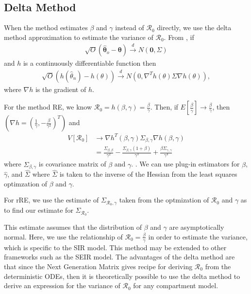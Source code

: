 \documentclass[12pt]{article}
\newcommand{\rr}{\ensuremath{\mathcal{R}_0}}
\begin{document}
\subsection{Delta Method}\label{delta-method}

When the method estimates \(\beta\) and \(\gamma\) instead of \(\rr\) directly, we use the delta method approximation to estimate the
variance of \(\rr\).   From \cite{wasserman2004}, if
\begin{align*}
  \sqrt{O} \left ( \hat{\mathbf{\theta}}_o - \mathbf{\theta} \right ) \overset{d}{\to} N\left ( \mathbf{0}, \Sigma \right  )
\end{align*}
and $h$ is a continuously differentiable function then
\begin{align*}
  \sqrt{O} \left (h(\hat{\theta}_n) - h(\theta) \right ) \overset{d}{\to} N \left (0,  \nabla^T h(\theta)\Sigma \nabla h(\theta)\right ),
\end{align*}
where $\nabla h$ is the gradient of $h$.

For the method RE, we know $\rr = h(\beta, \gamma) = \frac{\beta}{\gamma}$. Then, if $E\left [\frac{\hat{\beta}}{\hat{\gamma}}\right] \to \frac{\beta}{\gamma}$, then  $(\nabla h = (\frac{1}{\gamma},  -\frac{\beta}{\gamma^2})^T)$ and
\begin{align*}
  V[\rr] &\to \nabla h^T(\beta, \gamma) \Sigma_{\beta, \gamma} \nabla h(\beta, \gamma) \\
  &= \frac{\Sigma_{\beta, \beta}}{\gamma^2} - \frac{\Sigma_{\beta, \gamma}(1 + \beta)}{\gamma^3} + \frac{\beta \Sigma_{\gamma, \gamma}}{\gamma^4}
\end{align*}
where $\Sigma_{\beta, \gamma}$ is covariance matrix of \(\beta\) and \(\gamma\). .  We can use plug-in estimators for $\hat{\beta}$, $\hat{\gamma}$, and $\hat{\Sigma}$ where $\hat{\Sigma}$ is taken to the inverse of the Hessian from the least squares optimzation of $\beta$ and $\gamma$.

For rRE, we use the estimate of $\Sigma_{\rr, \gamma}$ taken from the optmization of $\rr$ and $\gamma$ as to find our estimate for $\hat{\Sigma}_{\rr}$.

This estimate assumes that the distribution of $\beta$ and $\gamma$ are asymptotically normal.  Here, we use the relationship of $\rr = \frac{\beta}{\gamma}$ in order to estimate the variance, which is specific to the SIR model.  This method may be extended to other frameworks such as the SEIR model.  The advantages of the delta method are that since the Next Generation Matrix \citep{diekmann2009} gives recipe for deriving $\rr$ from the deterministic ODEs, then it is theoretically possible to use the delta method to derive an expression for the variance of $\rr$ for any compartment model.
\end{document}
